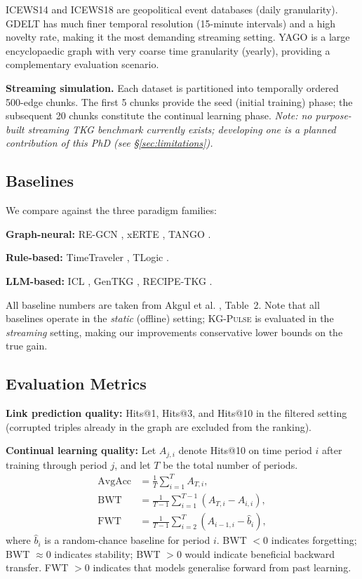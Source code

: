 \documentclass[10pt,a4paper,twocolumn]{article}
\theoremstyle{definition}
\newcommand{\ourmodel}{\textsc{KG-Pulse}}
\newcommand{\basemodel}{RECIPE-TKG}
\begin{document}
ICEWS14 and ICEWS18 are geopolitical event databases (daily granularity).
GDELT has much finer temporal resolution (15-minute intervals) and a high
novelty rate, making it the most demanding streaming setting.
YAGO is a large encyclopaedic graph with very coarse time granularity
(yearly), providing a complementary evaluation scenario.

\textbf{Streaming simulation.}
Each dataset is partitioned into temporally ordered 500-edge chunks.
The first 5 chunks provide the seed (initial training) phase;
the subsequent 20 chunks constitute the continual learning phase.
\emph{Note: no purpose-built streaming TKG benchmark currently exists;
developing one is a planned contribution of this PhD
(see §\ref{sec:limitations}).}

\subsection{Baselines}

We compare against the three paradigm families:

\textbf{Graph-neural:} RE-GCN \cite{Li2021regcn}, xERTE
\cite{Han2020xerte}, TANGO \cite{Han2021tango}.

\textbf{Rule-based:} TimeTraveler \cite{Sun2021timetraveler},
TLogic \cite{Liu2022tlogic}.

\textbf{LLM-based:} ICL \cite{Xiong2024icl},
GenTKG \cite{Liao2024gentkg}, \basemodel{} \cite{Akgul2025recipe}.

All baseline numbers are taken from Akgul et al. \cite{Akgul2025recipe}, Table~2.
Note that all baselines operate in the \emph{static} (offline) setting;
\ourmodel{} is evaluated in the \emph{streaming} setting, making our
improvements conservative lower bounds on the true gain.

\subsection{Evaluation Metrics}

\textbf{Link prediction quality:} Hits@1, Hits@3, and Hits@10 in the
filtered setting (corrupted triples already in the graph are excluded from
the ranking).

\textbf{Continual learning quality:} Let $A_{j,i}$ denote Hits@10 on
time period $i$ after training through period $j$, and let $T$ be the
total number of periods.
\begin{align*}
  \text{AvgAcc} &= \tfrac{1}{T}\textstyle\sum_{i=1}^{T} A_{T,i}, \\
  \text{BWT}    &= \tfrac{1}{T-1}\textstyle\sum_{i=1}^{T-1}(A_{T,i} - A_{i,i}), \\
  \text{FWT}    &= \tfrac{1}{T-1}\textstyle\sum_{i=2}^{T}(A_{i-1,i} - \hat{b}_i),
\end{align*}
where $\hat{b}_i$ is a random-chance baseline for period $i$.
BWT $< 0$ indicates forgetting; BWT $\approx 0$ indicates stability;
BWT $> 0$ would indicate beneficial backward transfer.
FWT $> 0$ indicates that models generalise forward from past learning.
\end{document}
